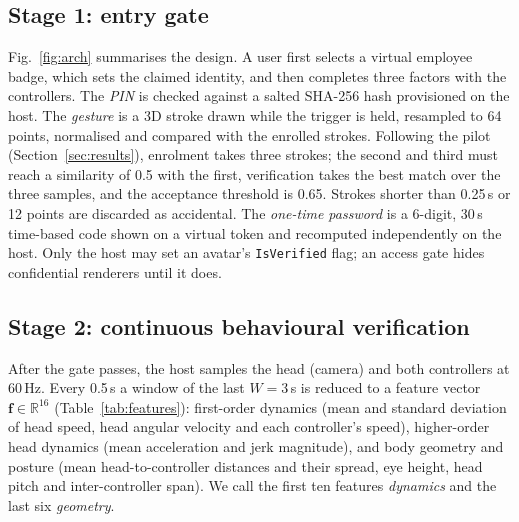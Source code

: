 \subsection{Stage 1: entry gate}
Fig.~\ref{fig:arch} summarises the design. A user first selects a virtual employee badge, which sets the claimed identity, and then completes three factors with the controllers. The \emph{PIN} is checked against a salted SHA-256 hash provisioned on the host. The \emph{gesture} is a 3D stroke drawn while the trigger is held, resampled to 64 points, normalised and compared with the enrolled strokes. Following the pilot (Section~\ref{sec:results}), enrolment takes three strokes; the second and third must reach a similarity of 0.5 with the first, verification takes the best match over the three samples, and the acceptance threshold is 0.65. Strokes shorter than 0.25\,s or 12 points are discarded as accidental. The \emph{one-time password} is a 6-digit, 30\,s time-based code shown on a virtual token and recomputed independently on the host. Only the host may set an avatar's \texttt{IsVerified} flag; an access gate hides confidential renderers until it does.

\subsection{Stage 2: continuous behavioural verification}
After the gate passes, the host samples the head (camera) and both controllers at 60\,Hz. Every 0.5\,s a window of the last $W{=}3$\,s is reduced to a feature vector $\mathbf{f}\in\mathbb{R}^{16}$ (Table~\ref{tab:features}): first-order dynamics (mean and standard deviation of head speed, head angular velocity and each controller's speed), higher-order head dynamics (mean acceleration and jerk magnitude), and body geometry and posture (mean head-to-controller distances and their spread, eye height, head pitch and inter-controller span). We call the first ten features \emph{dynamics} and the last six \emph{geometry}.

\begin{table}[t]
\caption{The 16 kinematic features computed per 3\,s window.}
\label{tab:features}
\centering\footnotesize
\setlength{\tabcolsep}{3pt}
\end{table}

